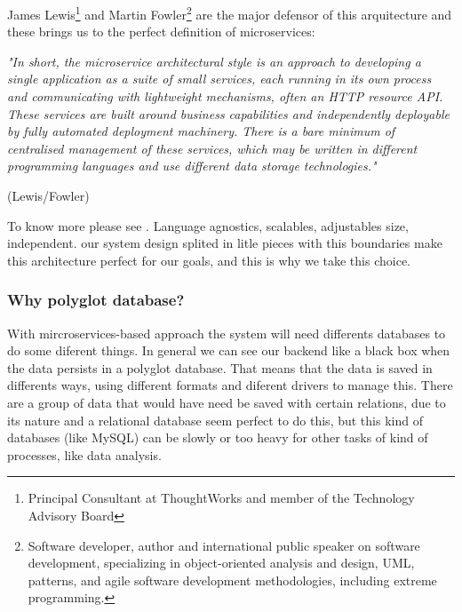 \noindent James Lewis\footnote{Principal Consultant at ThoughtWorks and
member of the Technology Advisory Board} and Martin Fowler\footnote{Software developer,
author and international public speaker on software development, specializing in
object-oriented analysis and design, UML, patterns, and agile software development
methodologies, including extreme programming.} are the major defensor of this
arquitecture and these brings us to the perfect definition of microservices:
\bigskip

\begin{minipage}{0.9\linewidth}
        \vspace{5pt}
        {\small
        \textit{"In short, the microservice architectural style is an approach to developing a
        single application as a suite of small services, each running in its own process
        and communicating with lightweight mechanisms, often an HTTP resource API.
        These services are built around business capabilities and independently deployable
        by fully automated deployment machinery. There is a bare minimum of centralised management
        of these services, which may be written in different programming languages and
        use different data storage technologies."}
        }
        \begin{flushright}
            (Lewis/Fowler)
        \end{flushright}
        \vspace{5pt}
    \end{minipage}

To know more please see \cite{Fowler14Micro}.
\intro
Language agnostics, scalables, adjustables size, independent. our system design
splited in litle pieces with this boundaries make this architecture perfect for
our goals, and this is why we take this choice.

\subsubsection{Why polyglot database?}

With mircroservices-based approach the system will need differents databases to do
some diferent things. In general we can see our
backend like a black box when the data persists in a polyglot database.
That means that the data is saved in differents ways, using different
formats and diferent drivers to manage this. There are a group of
data that would have need be saved with certain relations, due to its nature
and a relational database seem perfect to do this, but this kind of
databases (like MySQL) can be slowly or too heavy for other tasks
of kind of processes, like data analysis.


